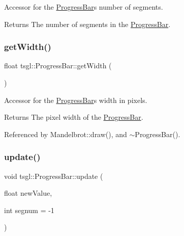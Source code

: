 Accessor for the \hyperlink{classtsgl_1_1_progress_bar}{Progress\+Bar}\textquotesingle{}s number of segments. 

\begin{DoxyReturn}{Returns}
The number of segments in the \hyperlink{classtsgl_1_1_progress_bar}{Progress\+Bar}. 
\end{DoxyReturn}
\mbox{\label{classtsgl_1_1_progress_bar_ab781b1c8a4b68b9a875dba3773577747}} 
\subsubsection{\texorpdfstring{get\+Width()}{getWidth()}}
{\footnotesize\ttfamily float tsgl\+::\+Progress\+Bar\+::get\+Width (\begin{DoxyParamCaption}{ }\end{DoxyParamCaption})\hspace{0.3cm}{\ttfamily [inline]}}



Accessor for the \hyperlink{classtsgl_1_1_progress_bar}{Progress\+Bar}\textquotesingle{}s width in pixels. 

\begin{DoxyReturn}{Returns}
The pixel width of the \hyperlink{classtsgl_1_1_progress_bar}{Progress\+Bar}. 
\end{DoxyReturn}


Referenced by Mandelbrot\+::draw(), and $\sim$\+Progress\+Bar().

\mbox{\label{classtsgl_1_1_progress_bar_a4274998e4935f33eb9212b2174d9c0c5}} 
\subsubsection{\texorpdfstring{update()}{update()}}
{\footnotesize\ttfamily void tsgl\+::\+Progress\+Bar\+::update (\begin{DoxyParamCaption}\item[{float}]{new\+Value,  }\item[{int}]{segnum = {\ttfamily -\/1} }\end{DoxyParamCaption})}




